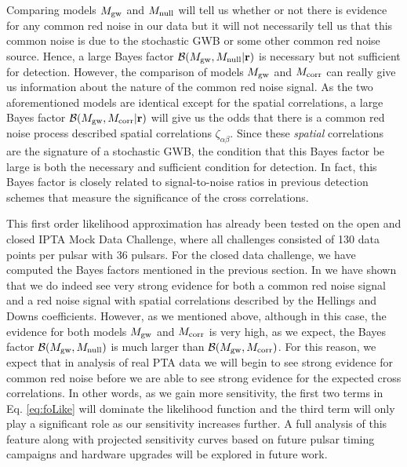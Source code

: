 \documentclass[iop]{emulateapj} \usepackage{apjfonts}
\begin{document}
 Comparing models $M_{\rm gw}$ and $M_{\rm null}$ will tell us whether
or not there is evidence for any common red noise in our data but it
will not necessarily tell us that this common noise is due to the
stochastic GWB or some other common red noise source. Hence, a large
Bayes factor $\mathcal{B}(M_{\rm gw},M_{\rm null}|\mathbf{r})$ is
necessary but not sufficient for detection. However, the comparison of
models $M_{\rm gw}$ and $M_{\rm corr}$ can really give us information
about the nature of the common red noise signal. As the two
aforementioned models are identical except for the spatial
correlations, a large Bayes factor $\mathcal{B}(M_{\rm gw},M_{\rm
corr}|\mathbf{r})$ will give us the odds that there is a common red
noise process described spatial correlations $\zeta_{\alpha\beta}$.
Since these \emph{spatial} correlations are the signature of a
stochastic GWB, the condition that this Bayes factor be large is both
the necessary and sufficient condition for detection. In fact, this
Bayes factor is closely related to signal-to-noise ratios in previous
detection schemes \citep{jhl+05,abc+09,ych+11,cce+12} that measure the
significance of the cross correlations.
 
This first order likelihood approximation has already been tested on
the open and closed \citep{esc12b} IPTA Mock Data Challenge, where all
challenges consisted of 130 data points per pulsar with 36 pulsars.
For the closed data challenge, we have computed the Bayes factors
mentioned in the previous section. In \cite{esc12b} we have shown that
we do indeed see very strong evidence for both a common red noise
signal and a red noise signal with spatial correlations described by
the Hellings and Downs coefficients. However, as we mentioned above,
although in this case, the evidence for both models $M_{\rm gw}$ and
$M_{\rm corr}$ is very high, as we expect, the Bayes factor
$\mathcal{B}(M_{\rm gw},M_{\rm null})$ is much larger than
$\mathcal{B}(M_{\rm gw},M_{\rm corr})$. For this reason, we expect
that in analysis of real PTA data we will begin to see strong evidence
for common red noise before we are able to see strong evidence for the
expected cross correlations. In other words, as we gain more
sensitivity, the first two terms in Eq. \ref{eq:foLike} will dominate
the likelihood function and the third term will only play a
significant role as our sensitivity increases further. A full analysis
of this feature along with projected sensitivity curves based on
future pulsar timing campaigns and hardware upgrades will be explored
in future work.
\end{document}
